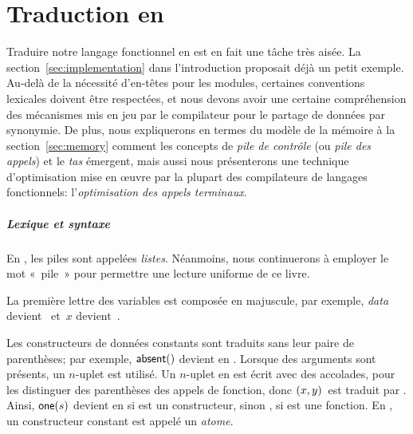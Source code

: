 \chapter{Traduction en \Erlang}

Traduire notre langage fonctionnel en \Erlang est en fait une tâche
très aisée. La section~\ref{sec:implementation} dans l'introduction
proposait déjà un petit exemple. Au-delà de la nécessité d'en-têtes
pour les modules, certaines conventions lexicales doivent être
respectées, et nous devons avoir une certaine compréhension des
mécanismes mis en jeu par le compilateur pour le partage de données
par synonymie. De plus, nous expliquerons en termes du modèle de la
mémoire à la section~\ref{sec:memory} comment les concepts de
\emph{pile de contrôle} (ou \emph{pile des appels}) et le \emph{tas}
émergent, mais aussi nous présenterons une technique d'optimisation
mise en {\oe}uvre par la plupart des compilateurs de langages
fonctionnels: l'\emph{optimisation des appels
  terminaux}.

\paragraph{Lexique et syntaxe}

En \Erlang, les piles sont appelées \emph{listes}. Néanmoins, nous
continuerons à employer le mot «~pile~» pour permettre une lecture
uniforme de ce livre.

La première lettre des variables est composée en majuscule, par
exem\-ple, \emph{data} devient~ et~\(x\)
devient~.

Les constructeurs de données constants sont traduits sans leur paire de parenthèses; par
exemple, \(\textsf{absent}()\) devient  en
\Erlang. Lorsque des arguments sont présents, un \(n\)-uplet est
utilisé. Un \(n\)-uplet en \Erlang est écrit avec des accolades, pour
les distinguer des parenthèses des appels de fonction, donc
\(({x},{y})\)~est traduit par . Ainsi,
\(\textsf{one}(s)\) devient  en \Erlang si 
est un constructeur, sinon , si  est
une fonction. En \Erlang, un constructeur constant est appelé un
\emph{atome}.

